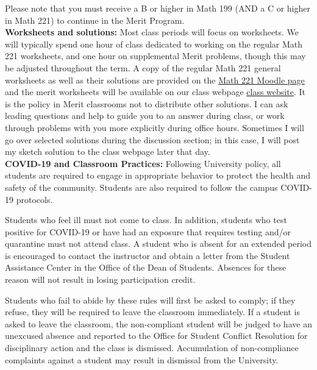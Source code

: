 \documentclass[12pt]{article}
\begin{document}
Please note that you must receive a B or higher in Math 199 (AND a C or higher in Math 221) to continue in the Merit Program.\\


\noindent \textbf{Worksheets and solutions:} Most class periods will focus on worksheets. We will typically spend one hour of class dedicated to working on the regular Math 221 worksheets, and one hour on supplemental Merit problems, though this may be adjusted throughout the term. A copy of the regular Math 221 general worksheets as well as their solutions are provided on the \textcolor{blue}{\href{https://learn.illinois.edu/course/view.php?id=60327}{Math 221 Moodle page}} and the merit worksheets will be available on our class webpage \textcolor{blue}{\href{https://htrungvu.com/fall2021_calc1.html}{class website}}. It is the policy in Merit classrooms not to distribute other solutions. I can ask leading questions and help to guide you to an answer during class, or work through problems with you more explicitly during office hours. Sometimes I will go over selected solutions during the discussion section; in this case, I will post my sketch solution to the class webpage later that day.\\


\noindent \textbf{COVID-19 and Classroom Practices:} Following University policy, all students are required to engage in appropriate behavior to protect the health and safety of the community. Students are also required to follow the campus COVID-19 protocols.

Students who feel ill must not come to class. In addition, students who test positive for COVID-19 or have had an exposure that requires testing and/or quarantine must not attend class. A student who is absent for an extended period is encouraged to contact the instructor and obtain a letter from the Student Assistance Center in the Office of the Dean of Students. Absences for these reason will not result in losing participation credit.
   
Students who fail to abide by these rules will first be asked to comply; if they refuse, they will be required to leave the classroom immediately. If a student is asked to leave the classroom, the non-compliant student will be judged to have an unexcused absence and reported to the Office for Student Conflict Resolution for disciplinary action and the class is dismissed. Accumulation of non-compliance complaints against a student may result in dismissal from the University.
\end{document}
